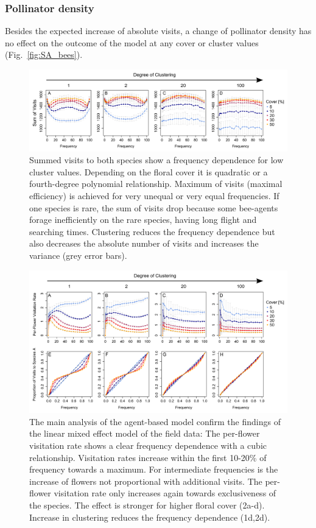 \subsubsection*{Pollinator density}
Besides the expected increase of absolute visits, a change of pollinator density has no effect on the outcome of the model at any cover or cluster values (Fig.~\ref{fig:SA_bees}).

\begin{figure} [h] %
	\centering
	\includegraphics[width=17cm]{Images/SUM}
	\caption{Summed visits to both species show a frequency dependence for low cluster values. Depending on the floral cover it is quadratic or a fourth-degree polynomial relationship. Maximum of visits (maximal efficiency) is achieved for very unequal or very equal frequencies. If one species is rare, the sum of visits drop because some bee-agents forage inefficiently on the rare species, having long flight and searching times. Clustering reduces the frequency dependence but also decreases the absolute number of visits and increases the variance (grey error bars).}
	\label{fig:SUM}
\end{figure}

\begin{figure} [ht] %
	\centering
	\includegraphics[width=17cm]{Images/PFV}
	\caption{The main analysis of the agent-based model confirm the findings of the linear mixed effect model of the field data: The per-flower visitation rate shows a clear frequency dependence with a cubic relationship. Visitation rates increase within the first 10-20\% of frequency towards a maximum. For intermediate frequencies is the increase of flowers not proportional with additional visits. The per-flower visitation rate only increases again towards exclusiveness of the species. The effect is stronger for higher floral cover (2a-d). Increase in clustering reduces the frequency dependence (1d,2d).}
	\label{fig:PFV}
\end{figure}


